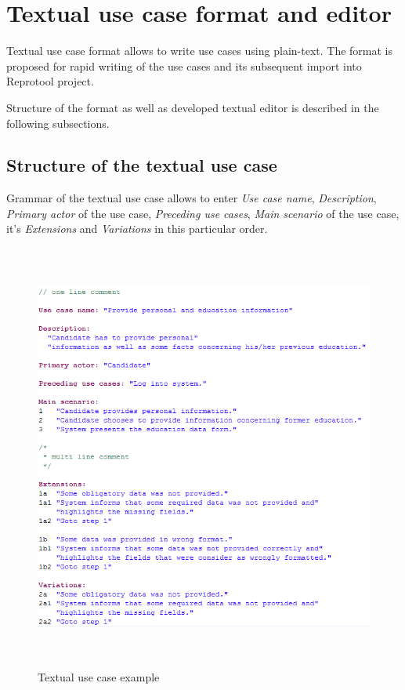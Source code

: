 \section{Textual use case format and editor}

Textual use case format allows to write use cases using plain-text. The format is proposed for rapid writing of the use cases and its subsequent import into Reprotool project.

Structure of the format as well as developed textual editor is described in
the following subsections.

\subsection{Structure of the textual use case}

Grammar of the textual use case allows to enter \textit{Use case name}, \textit{Description}, \textit{Primary actor} of the use case, \textit{Preceding use cases}, \textit{Main scenario} of the use case, it's \textit{Extensions} and \textit{Variations} in this particular order.

\begin{figure}[ht]
  \centering
  \includegraphics[height=400pt]{images/txtuc-editor/filledTxtuc}
  \caption{Textual use case example}
  \label{fig:filledTxtuc}
\end{figure}

